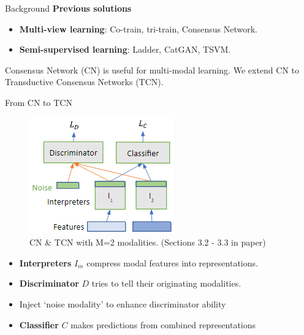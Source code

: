 \documentclass[final]{beamer}
\newlength{\onecolwid}
\begin{document}
\begin{frame}[t]
\begin{columns}[t]
\begin{column}{\onecolwid}
\begin{block}{Background}
\textbf{Previous solutions}
\begin{itemize}
    \item \textbf{Multi-view learning}: Co-train, tri-train, Consensus Network.
    \item \textbf{Semi-supervised learning}: Ladder, CatGAN, TSVM.
\end{itemize}

Consensus Network (CN)\cite{CN2018} is useful for multi-modal learning. We extend CN to Transductive Consensus Networks (TCN).

\end{block}

\begin{block}{From CN to TCN}
\begin{figure}
    \centering
    \includegraphics[width=.6\textwidth]{images/TCN_model.png}
    \caption{CN \& TCN with M=2 modalities. (Sections 3.2 - 3.3 in paper)}
    \label{fig:cn_structure}
\end{figure}

\begin{itemize}
    \item \textbf{Interpreters} $I_m$ compress modal features into representations.
    
    \item \textbf{Discriminator} $D$ tries to tell their originating modalities. 
    
    \item Inject `noise modality' to enhance discriminator ability
    
    \item \textbf{Classifier} $C$ makes predictions from combined representations
\end{itemize}


\end{block}
\end{column}
\end{columns}
\end{frame}
\end{document}

